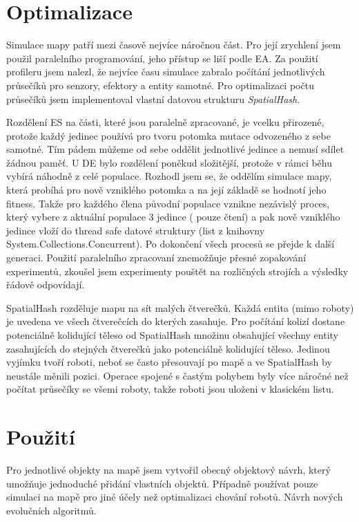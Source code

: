 \section*{Optimalizace}
Simulace mapy patří mezi časově nejvíce náročnou část. Pro její zrychlení jsem použil paralelního programování, jeho přístup se liší podle EA. Za použití profileru jsem nalezl, že nejvíce času simulace zabralo počítání jednotlivých průsečíků pro senzory, efektory a entity samotné. Pro optimalizaci počtu průsečíků jsem implementoval vlastní datovou strukturu \textit{SpatialHash}. 
\par
Rozdělení ES na části, které jsou paralelně zpracované, je vcelku přirozené, protože každý jedinec používá pro tvoru potomka mutace odvozeného z sebe samotné. Tím pádem můžeme od sebe oddělit jednotlivé jedince a nemusí sdílet žádnou paměť. U DE bylo rozdělení poněkud složitější, protože v rámci běhu vybírá náhodně z celé populace. Rozhodl jsem se, že oddělím simulace mapy, která probíhá pro nově vzniklého potomka a na její základě se hodnotí jeho fitness. Takže pro každého člena původní populace vznikne nezávislý proces, který vybere z aktuální populace 3 jedince ( pouze čtení) a pak nově vzniklého jedince vloží do thread safe datové struktury (list z knihovny System.Collections.Concurrent). Po dokončení všech procesů se přejde k další generaci.  Použití paralelního zpracovaní znemožňuje přesné zopakování experimentů, zkoušel jsem experimenty pouštět na rozličných strojích a výsledky řádově odpovídají.  
\par 
SpatialHash rozděluje mapu na sít malých čtverečků. Každá entita (mimo roboty) je uvedena ve všech čtverečcích do kterých zasahuje. Pro počítání kolizí dostane potenciálně kolidující těleso od SpatialHash množinu obsahující všechny entity zasahujících do stejných čtverečků jako potenciálně kolidující těleso. Jedinou vyjímku tvoří roboti, neboť se často přesouvají po mapě a ve SpatialHash by neustále měnili pozici. Operace spojené s častým pohybem byly více náročné než počítat průsečíky se všemi roboty, takže roboti jsou uloženi v klasickém listu.
\section*{Použití}
Pro jednotlivé objekty na mapě jsem vytvořil obecný objektový návrh, který umožňuje jednoduché přidání vlastních objektů. Případně používat pouze simulaci na mapě pro jiné účely než optimalizaci chování robotů. Návrh nových evolučních algoritmů.  

